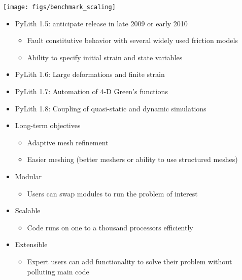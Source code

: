 \documentclass[pdftex,cig,slideColor]{pp4slides}
\begin{document}

  \vfill
  \begin{center}
    \texttt{[image: figs/benchmark\_scaling]}
  \end{center}
  \vfill


  \begin{itemize}
  \item PyLith 1.5: anticipate release in late 2009 or early 2010
    \begin{itemize}
    \item Fault constitutive behavior with several widely used friction models
    \item Ability to specify initial strain and state variables
    \end{itemize}
  \item PyLith 1.6: Large deformations and finite strain
  \item PyLith 1.7: Automation of 4-D Green's functions
  \item PyLith 1.8: Coupling of quasi-static and dynamic simulations
  \item Long-term objectives
    \begin{itemize}
    \item Adaptive mesh refinement
    \item Easier meshing (better meshers or ability to use structured meshes)
    \end{itemize}
  \end{itemize}
  
  
  \begin{itemize}
  \item Modular
    \begin{itemize}
    \item Users can swap modules to run the problem of interest
    \end{itemize}
  \item Scalable
    \begin{itemize}
    \item Code runs on one to a thousand processors efficiently
    \end{itemize}    
  \item Extensible
    \begin{itemize}
    \item Expert users can add functionality to solve their problem
      without polluting main code
    \end{itemize}
  \end{itemize}
\end{document}
